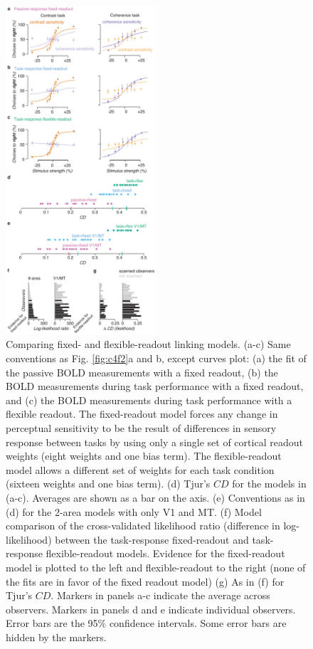 \documentclass{report}
\begin{document}
\begin{figure}
\centering
\includegraphics[keepaspectratio,width=0.5\textwidth]{figs_c2/Fig7_readout.pdf}
\caption[Comparing fixed- and flexible-readout linking models]{Comparing fixed- and flexible-readout linking models. (a-c) Same conventions as Fig. \ref{fig:c4f2}a and b, except curves plot: (a) the fit of the passive BOLD measurements with a fixed readout, (b) the BOLD measurements during task performance with a fixed readout, and (c) the BOLD measurements during task performance with a flexible readout. The fixed-readout model forces any change in perceptual sensitivity to be the result of differences in sensory response between tasks by using only a single set of cortical readout weights (eight weights and one bias term). The flexible-readout model allows a different set of weights for each task condition (sixteen weights and one bias term). (d) Tjur’s $CD$ for the models in (a-c). Averages are shown as a bar on the axis. (e) Conventions as in (d) for the 2-area models with only V1 and MT. (f) Model comparison of the cross-validated likelihood ratio (difference in log-likelihood) between the task-response fixed-readout and task-response flexible-readout models. Evidence for the fixed-readout model is plotted to the left and flexible-readout to the right (none of the fits are in favor of the fixed readout model) (g) As in (f) for Tjur’s $CD$. Markers in panels a-c indicate the average across observers. Markers in panels d and e indicate individual observers. Error bars are the 95\% confidence intervals. Some error bars are hidden by the markers.}
\label{fig:c4f7}
\end{figure}
\end{document}
